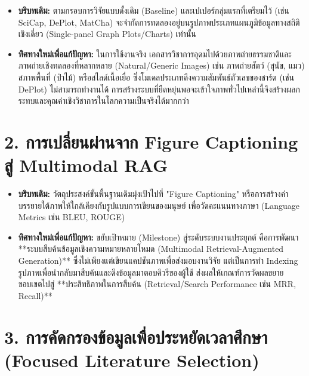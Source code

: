 \documentclass[10pt,a4paper]{article}
\begin{document}
\begin{itemize}
  \item \textbf{บริบทเดิม:} ตามกรอบการวิจัยแบบดั้งเดิม (Baseline) และเปเปอร์กลุ่มแรกที่เตรียมไว้ (เช่น SciCap, DePlot, MatCha) จะจำกัดการทดลองอยู่บนรูปภาพประเภทแผนภูมิข้อมูลทางสถิติเชิงเดี่ยว (Single-panel Graph Plots/Charts) เท่านั้น
  \item \textbf{ทิศทางใหม่เพื่อแก้ปัญหา:} ในการใช้งานจริง เอกสารวิชาการอุดมไปด้วยภาพถ่ายธรรมชาติและภาพถ่ายเชิงทดลองที่หลากหลาย (Natural/Generic Images) เช่น ภาพถ่ายสัตว์ (สุนัข, แมว) สภาพพื้นที่ (ป่าไม้) หรือสไลด์เนื้อเยื่อ ซึ่งโมเดลประเภทดึงความสัมพันธ์ตัวเลขของชาร์ต (เช่น DePlot) ไม่สามารถทำงานได้ การสร้างระบบที่ยืดหยุ่นพอจะเข้าใจภาพทั่วไปเหล่านี้จึงสร้างผลกระทบและคุณค่าเชิงวิชาการในโลกความเป็นจริงได้มากกว่า
\end{itemize}

\vspace{6pt}

\section*{2. การเปลี่ยนผ่านจาก Figure Captioning สู่ Multimodal RAG}

\begin{itemize}
  \item \textbf{บริบทเดิม:} วัตถุประสงค์ขั้นพื้นฐานเดิมมุ่งเป้าไปที่ "Figure Captioning" หรือการสร้างคำบรรยายใต้ภาพให้ใกล้เคียงกับรูปแบบการเขียนของมนุษย์ เพื่อวัดคะแนนทางภาษา (Language Metrics เช่น BLEU, ROUGE)
  \item \textbf{ทิศทางใหม่เพื่อแก้ปัญหา:} ขยับเป้าหมาย (Milestone) สู่ระดับระบบงานประยุกต์ คือการพัฒนา **ระบบสืบค้นข้อมูลเชิงความหมายหลายโหมด (Multimodal Retrieval-Augmented Generation)** ซึ่งไม่เพียงแต่เขียนแคปชันภาพเพื่อส่งมอบงานวิจัย แต่เป็นการทำ Indexing รูปภาพเพื่อนำกลับมาสืบค้นและดึงข้อมูลมาตอบคิวรีของผู้ใช้ ส่งผลให้เกณฑ์การวัดผลขยายขอบเขตไปสู่ **ประสิทธิภาพในการสืบค้น (Retrieval/Search Performance เช่น MRR, Recall)**
\end{itemize}

\vspace{6pt}

\section*{3. การคัดกรองข้อมูลเพื่อประหยัดเวลาศึกษา (Focused Literature Selection)}
\end{document}
